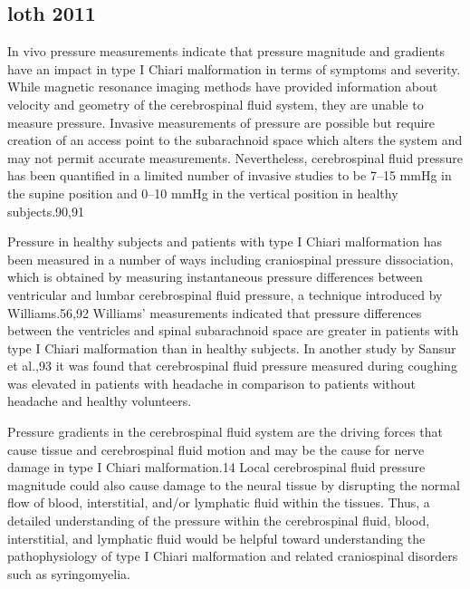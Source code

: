 \documentclass{report}
\begin{document}
\subsection{loth 2011}

In vivo pressure measurements indicate that pressure
magnitude and gradients have an impact in type I
Chiari malformation in terms of symptoms and
severity. While magnetic resonance imaging methods
have provided information about velocity and
geometry of the cerebrospinal fluid system, they are
unable to measure pressure. Invasive measurements
of pressure are possible but require creation of an
access point to the subarachnoid space which alters
the system and may not permit accurate measurements.
Nevertheless, cerebrospinal fluid pressure has
been quantified in a limited number of invasive
studies to be 7–15 mmHg in the supine position and
0–10 mmHg in the vertical position in healthy
subjects.90,91

Pressure in healthy subjects and patients
with type I Chiari malformation has been measured
in a number of ways including craniospinal pressure
dissociation, which is obtained by measuring instantaneous
pressure differences between ventricular and
lumbar cerebrospinal fluid pressure, a technique
introduced by Williams.56,92 Williams’ measurements
indicated that pressure differences between the
ventricles and spinal subarachnoid space are greater
in patients with type I Chiari malformation than in
healthy subjects. In another study by Sansur et al.,93
it was found that cerebrospinal fluid pressure
measured during coughing was elevated in patients
with headache in comparison to patients without
headache and healthy volunteers.

Pressure gradients in the cerebrospinal fluid system
are the driving forces that cause tissue and cerebrospinal
fluid motion and may be the cause for
nerve damage in type I Chiari malformation.14 Local
cerebrospinal fluid pressure magnitude could also
cause damage to the neural tissue by disrupting the
normal flow of blood, interstitial, and/or lymphatic
fluid within the tissues. Thus, a detailed understanding
of the pressure within the cerebrospinal
fluid, blood, interstitial, and lymphatic fluid would be
helpful toward understanding the pathophysiology of
type I Chiari malformation and related craniospinal
disorders such as syringomyelia.
\end{document}
